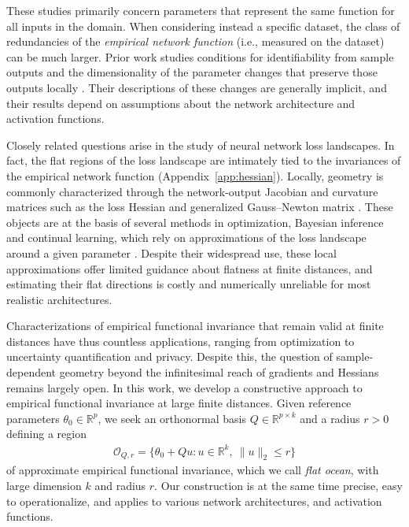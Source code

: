 \documentclass[twoside]{article}
\theoremstyle{remark}
\theoremstyle{highlightdefinition}
\theoremstyle{remark}
\begin{document}
These studies primarily concern parameters that represent the same function for all inputs in the domain. When considering instead a specific dataset, the class of redundancies of the \emph{empirical network function} (i.e., measured on the dataset) can be much larger. Prior work studies conditions for identifiability from sample outputs and the dimensionality of the parameter changes that preserve those outputs locally \citep{stock2021embedding,bonapellissier2022local,grigsby2025functional,bonapellissier2024geometry}.  Their descriptions of these changes are generally implicit, and their results depend on assumptions about the network architecture and activation functions.

Closely related questions arise in the study of neural network loss landscapes. In fact, the flat regions of the loss landscape are intimately tied to the invariances of the empirical network function (Appendix~\ref{app:hessian}). Locally, geometry is commonly characterized through the network-output Jacobian and curvature matrices such as the loss Hessian and generalized Gauss--Newton matrix \citep{sagun2017hessian,immer2021linearization}. These objects are at the basis of several methods in optimization, Bayesian inference and continual learning, which rely on approximations of the loss landscape around a given parameter  \citep{martens2015kfac,khan2018vogn,daxberger2021laplace,kirkpatrick2017ewc,farajtabar2020ogd}. 
Despite their widespread use, these local approximations offer limited guidance about flatness at finite distances, and estimating their flat directions is costly and numerically unreliable for most realistic architectures.

Characterizations of empirical functional invariance that remain valid at finite distances have thus countless applications, ranging from optimization to uncertainty quantification and privacy.
Despite this, the question of sample-dependent geometry beyond the infinitesimal reach of gradients and Hessians remains largely open. 
In this work, we develop a constructive approach to empirical functional invariance at large finite distances. Given reference parameters $\theta_0\in\mathbb R^p$, we seek an orthonormal basis $Q\in\mathbb R^{p\times k}$ and a radius $r>0$ defining a region
\begin{align*}
\mathcal O_{Q,r}=\{\theta_0+Qu:u\in\mathbb R^k,\ \|u\|_2\le r\}
\end{align*}
of approximate empirical functional invariance, which we call \emph{flat ocean}, with large dimension $k$ and radius $r$. Our construction is at the same time precise, easy to operationalize, and applies to various network architectures, and activation functions. 
\end{document}

